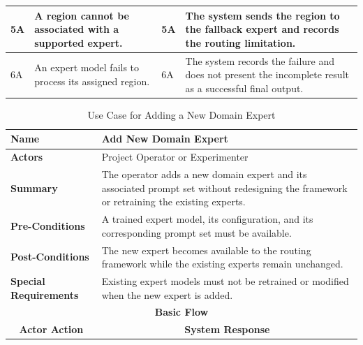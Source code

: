 \documentclass{FastFyp}
\begin{document}
\begin{longtable}{|p{0.7cm}|p{2.7cm}|p{3.5cm}|p{0.8cm}|p{5.7cm}|}
5A &
\multicolumn{2}{p{6.2cm}|}{
A region cannot be associated with a supported expert.
} &
5A &
The system sends the region to the fallback expert and records the routing limitation. \\ \hline

6A &
\multicolumn{2}{p{6.2cm}|}{
An expert model fails to process its assigned region.
} &
6A &
The system records the failure and does not present the incomplete result as a successful final output. \\ \hline

\end{longtable}


\begin{longtable}{|p{0.7cm}|p{2.7cm}|p{3.5cm}|p{0.8cm}|p{5.7cm}|}
\caption{Use Case for Adding a New Domain Expert}
\label{tab:uc-add-expert}\\
\hline

\multicolumn{2}{|l|}{\textbf{Name}} &
\multicolumn{3}{p{10.4cm}|}{Add New Domain Expert} \\ \hline

\multicolumn{2}{|l|}{\textbf{Actors}} &
\multicolumn{3}{p{10.4cm}|}{Project Operator or Experimenter} \\ \hline

\multicolumn{2}{|l|}{\textbf{Summary}} &
\multicolumn{3}{p{10.4cm}|}{
The operator adds a new domain expert and its associated prompt set without redesigning the framework or retraining the existing experts.
} \\ \hline

\multicolumn{2}{|l|}{\textbf{Pre-Conditions}} &
\multicolumn{3}{p{10.4cm}|}{
A trained expert model, its configuration, and its corresponding prompt set must be available.
} \\ \hline

\multicolumn{2}{|l|}{\textbf{Post-Conditions}} &
\multicolumn{3}{p{10.4cm}|}{
The new expert becomes available to the routing framework while the existing experts remain unchanged.
} \\ \hline

\multicolumn{2}{|l|}{\textbf{Special Requirements}} &
\multicolumn{3}{p{10.4cm}|}{
Existing expert models must not be retrained or modified when the new expert is added.
} \\ \hline

\multicolumn{5}{|c|}{\textbf{Basic Flow}} \\ \hline

\multicolumn{3}{|c|}{\textbf{Actor Action}} &
\multicolumn{2}{c|}{\textbf{System Response}} \\ \hline


\end{longtable}
\end{document}
